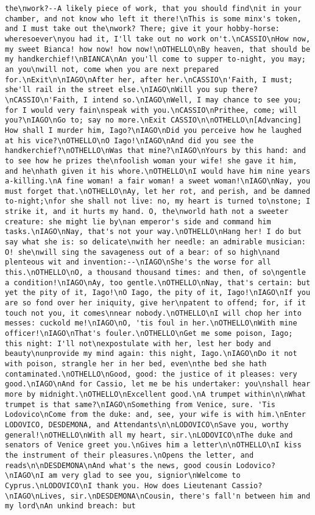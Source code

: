 \begin{verbatim}
the\nwork?--A likely piece of work, that you should find\nit in your chamber, and not know who left it there!\nThis is some minx's token, and I must take out the\nwork? There; give it your hobby-horse: wheresoever\nyou had it, I'll take out no work on't.\nCASSIO\nHow now, my sweet Bianca! how now! how now!\nOTHELLO\nBy heaven, that should be my handkerchief!\nBIANCA\nAn you'll come to supper to-night, you may; an you\nwill not, come when you are next prepared for.\nExit\n\nIAGO\nAfter her, after her.\nCASSIO\n'Faith, I must; she'll rail in the street else.\nIAGO\nWill you sup there?\nCASSIO\n'Faith, I intend so.\nIAGO\nWell, I may chance to see you; for I would very fain\nspeak with you.\nCASSIO\nPrithee, come; will you?\nIAGO\nGo to; say no more.\nExit CASSIO\n\nOTHELLO\n[Advancing] How shall I murder him, Iago?\nIAGO\nDid you perceive how he laughed at his vice?\nOTHELLO\nO Iago!\nIAGO\nAnd did you see the handkerchief?\nOTHELLO\nWas that mine?\nIAGO\nYours by this hand: and to see how he prizes the\nfoolish woman your wife! she gave it him, and he\nhath given it his whore.\nOTHELLO\nI would have him nine years a-killing.\nA fine woman! a fair woman! a sweet woman!\nIAGO\nNay, you must forget that.\nOTHELLO\nAy, let her rot, and perish, and be damned to-night;\nfor she shall not live: no, my heart is turned to\nstone; I strike it, and it hurts my hand. O, the\nworld hath not a sweeter creature: she might lie by\nan emperor's side and command him tasks.\nIAGO\nNay, that's not your way.\nOTHELLO\nHang her! I do but say what she is: so delicate\nwith her needle: an admirable musician: O! she\nwill sing the savageness out of a bear: of so high\nand plenteous wit and invention:--\nIAGO\nShe's the worse for all this.\nOTHELLO\nO, a thousand thousand times: and then, of so\ngentle a condition!\nIAGO\nAy, too gentle.\nOTHELLO\nNay, that's certain: but yet the pity of it, Iago!\nO Iago, the pity of it, Iago!\nIAGO\nIf you are so fond over her iniquity, give her\npatent to offend; for, if it touch not you, it comes\nnear nobody.\nOTHELLO\nI will chop her into messes: cuckold me!\nIAGO\nO, 'tis foul in her.\nOTHELLO\nWith mine officer!\nIAGO\nThat's fouler.\nOTHELLO\nGet me some poison, Iago; this night: I'll not\nexpostulate with her, lest her body and beauty\nunprovide my mind again: this night, Iago.\nIAGO\nDo it not with poison, strangle her in her bed, even\nthe bed she hath contaminated.\nOTHELLO\nGood, good: the justice of it pleases: very good.\nIAGO\nAnd for Cassio, let me be his undertaker: you\nshall hear more by midnight.\nOTHELLO\nExcellent good.\nA trumpet within\n\nWhat trumpet is that same?\nIAGO\nSomething from Venice, sure. 'Tis Lodovico\nCome from the duke: and, see, your wife is with him.\nEnter LODOVICO, DESDEMONA, and Attendants\n\nLODOVICO\nSave you, worthy general!\nOTHELLO\nWith all my heart, sir.\nLODOVICO\nThe duke and senators of Venice greet you.\nGives him a letter\n\nOTHELLO\nI kiss the instrument of their pleasures.\nOpens the letter, and reads\n\nDESDEMONA\nAnd what's the news, good cousin Lodovico?\nIAGO\nI am very glad to see you, signior\nWelcome to Cyprus.\nLODOVICO\nI thank you. How does Lieutenant Cassio?\nIAGO\nLives, sir.\nDESDEMONA\nCousin, there's fall'n between him and my lord\nAn unkind breach: but 
\end{verbatim}
